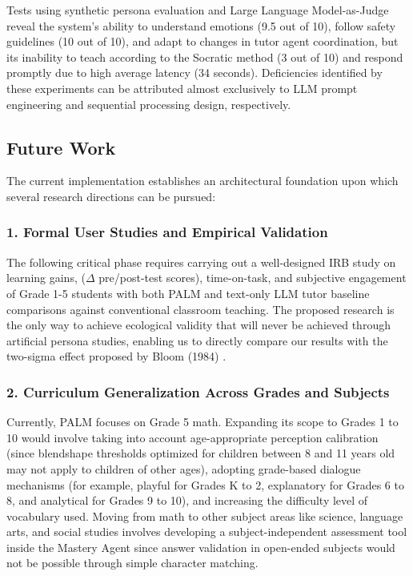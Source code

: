 \documentclass[conference, letterpaper]{IEEEtran}
\begin{document}
Tests using synthetic persona evaluation and Large Language Model-as-Judge reveal the system's ability to understand emotions (9.5 out of 10), follow safety guidelines (10 out of 10), and adapt to changes in tutor agent coordination, but its inability to teach according to the Socratic method (3 out of 10) and respond promptly due to high average latency (34 seconds). Deficiencies identified by these experiments can be attributed almost exclusively to LLM prompt engineering and sequential processing design, respectively.

\subsection*{Future Work}

The current implementation establishes an architectural foundation upon which several research directions can be pursued:

\subsubsection*{1. Formal User Studies and Empirical Validation}

The following critical phase requires carrying out a well-designed IRB study on learning gains, ($\Delta$ pre/post-test scores), time-on-task, and subjective engagement of Grade 1-5 students with both PALM and text-only LLM tutor baseline comparisons against conventional classroom teaching. The proposed research is the only way to achieve ecological validity that will never be achieved through artificial persona studies, enabling us to directly compare our results with the two-sigma effect proposed by Bloom (1984) \cite{bloom1984}.

\subsubsection*{2. Curriculum Generalization Across Grades and Subjects}

Currently, PALM focuses on Grade 5 math. Expanding its scope to Grades 1 to 10 would involve taking into account age-appropriate perception calibration (since blendshape thresholds optimized for children between 8 and 11 years old may not apply to children of other ages), adopting grade-based dialogue mechanisms (for example, playful for Grades K to 2, explanatory for Grades 6 to 8, and analytical for Grades 9 to 10), and increasing the difficulty level of vocabulary used. Moving from math to other subject areas like science, language arts, and social studies involves developing a subject-independent assessment tool inside the Mastery Agent since answer validation in open-ended subjects would not be possible through simple character matching.
\end{document}
